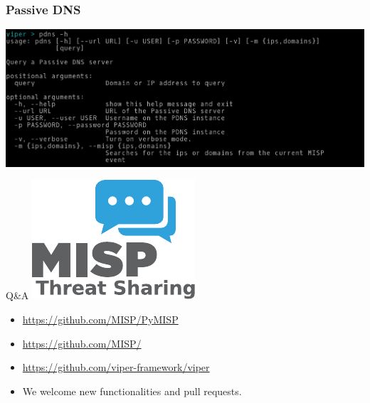 \begin{frame}[fragile]
    \frametitle{Passive DNS}
    \includegraphics[scale=0.32]{pdns.png}
\end{frame}

\begin{frame}[t,fragile] {Q\&A}
\includegraphics[scale=0.5]{misplogo.pdf}
\begin{itemize}
        \item \url{https://github.com/MISP/PyMISP}
        \item \url{https://github.com/MISP/}
        \item \url{https://github.com/viper-framework/viper}
        \item We welcome new functionalities and pull requests.
\end{itemize}

\end{frame}

